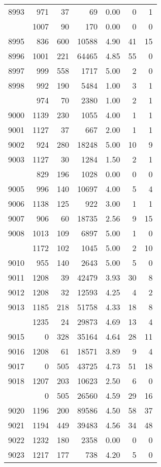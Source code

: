 \documentclass[
]{article}
\begin{document}
\begin{table}
\begin{tabular}[t]{lrrrrrr}
8993 & 971 & 37 & 69 & 0.00 & 0 & 1\\
\addlinespace
8994 & 1007 & 90 & 170 & 0.00 & 0 & 0\\
8995 & 836 & 600 & 10588 & 4.90 & 41 & 15\\
8996 & 1001 & 221 & 64465 & 4.85 & 55 & 0\\
8997 & 999 & 558 & 1717 & 5.00 & 2 & 0\\
8998 & 992 & 190 & 5484 & 1.00 & 3 & 1\\
\addlinespace
8999 & 974 & 70 & 2380 & 1.00 & 2 & 1\\
9000 & 1139 & 230 & 1055 & 4.00 & 1 & 1\\
9001 & 1127 & 37 & 667 & 2.00 & 1 & 1\\
9002 & 924 & 280 & 18248 & 5.00 & 10 & 9\\
9003 & 1127 & 30 & 1284 & 1.50 & 2 & 1\\
\addlinespace
9004 & 829 & 196 & 1028 & 0.00 & 0 & 0\\
9005 & 996 & 140 & 10697 & 4.00 & 5 & 4\\
9006 & 1138 & 125 & 922 & 3.00 & 1 & 1\\
9007 & 906 & 60 & 18735 & 2.56 & 9 & 15\\
9008 & 1013 & 109 & 6897 & 5.00 & 1 & 0\\
\addlinespace
9009 & 1172 & 102 & 1045 & 5.00 & 2 & 10\\
9010 & 955 & 140 & 2643 & 5.00 & 5 & 0\\
9011 & 1208 & 39 & 42479 & 3.93 & 30 & 8\\
9012 & 1208 & 32 & 12593 & 4.25 & 4 & 2\\
9013 & 1185 & 218 & 51758 & 4.33 & 18 & 8\\
\addlinespace
9014 & 1235 & 24 & 29873 & 4.69 & 13 & 4\\
9015 & 0 & 328 & 35164 & 4.64 & 28 & 11\\
9016 & 1208 & 61 & 18571 & 3.89 & 9 & 4\\
9017 & 0 & 505 & 43725 & 4.73 & 51 & 18\\
9018 & 1207 & 203 & 10623 & 2.50 & 6 & 0\\
\addlinespace
9019 & 0 & 505 & 26560 & 4.59 & 29 & 16\\
9020 & 1196 & 200 & 89586 & 4.50 & 58 & 37\\
9021 & 1194 & 449 & 39483 & 4.56 & 34 & 48\\
9022 & 1232 & 180 & 2358 & 0.00 & 0 & 0\\
9023 & 1217 & 177 & 738 & 4.20 & 5 & 0\\

\end{tabular}
\end{table}
\end{document}
